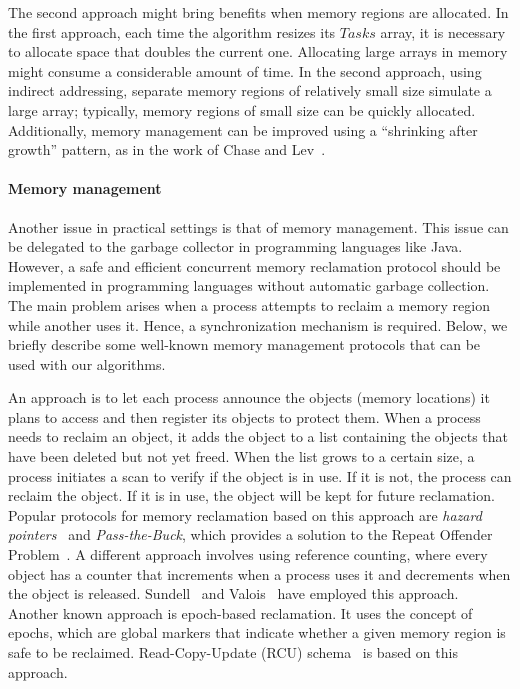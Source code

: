 The second approach might bring benefits when memory regions are allocated. In the first approach, each time the algorithm resizes its \(Tasks\) array, it is necessary to allocate space that doubles the current one. {Allocating large arrays in memory might consume a considerable amount of time.} In the second approach, using indirect addressing, separate memory regions of relatively small size simulate a large array; typically, memory regions of small size can be quickly allocated. Additionally, memory management can be improved using a ``shrinking after growth'' pattern, as in the work of Chase and Lev~\cite{circular.work.stealing}.


\paragraph*{Memory management}

Another issue in practical settings is that of memory management. This issue can be delegated to the garbage collector in programming languages like Java. However, a safe and efficient concurrent memory reclamation protocol should be implemented in programming languages without automatic garbage collection. The main problem arises when a process attempts to reclaim a memory region while another uses it. Hence, a synchronization mechanism is required. Below, we briefly describe some well-known memory management protocols that can be used with our algorithms.

An approach is to let each process announce the objects (memory locations) it plans to access and then register its objects to protect them. When a process needs to reclaim an object, it adds the object to a list containing the objects that have been deleted but not yet freed. When the list grows to a certain size, a process initiates a scan to verify if the object is in use.  If it is not, the process can reclaim the object. If it is in use, the object will be kept for future reclamation. Popular protocols for memory reclamation based on this approach are \textit{hazard pointers}~\cite{DBLP_journals_tpds_Michael04} and \emph{Pass-the-Buck}, which provides a solution to the Repeat Offender Problem~\cite{DBLP_conf_wdag_HerlihyLM02}. A different approach involves using reference counting, where every object has a counter that increments when a process uses it and decrements when the object is released. Sundell~\cite{DBLP_conf_ipps_Sundell05} and Valois~\cite{DBLP_conf_podc_Valois95} have employed this approach. Another known approach is epoch-based reclamation. It uses the concept of epochs, which are global markers that indicate whether a given memory region is safe to be reclaimed. Read-Copy-Update (RCU) schema~\cite{mckenney2001read} is based on this approach.

